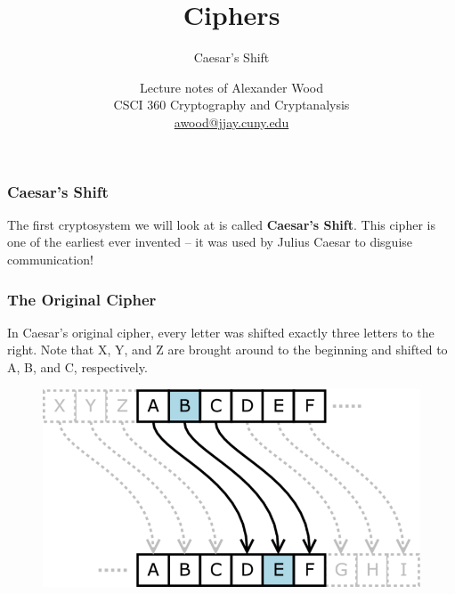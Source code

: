 \documentclass{beamer}
\title[CSCI360]{Ciphers}
\subtitle{Caesar's Shift}
\author
{Lecture notes of Alexander Wood \\ CSCI 360 Cryptography and Cryptanalysis \\ \scriptsize \href{mailto:awood@jjay.cuny.edu}{awood@jjay.cuny.edu}}
\institute[JJay]{John Jay College of Criminal Justice}
\date{}
\newcommand{\<}{\langle}
\renewcommand{\>}{\rangle}
\begin{document}

\begin{frame}
  \titlepage
\end{frame}


\begin{frame}
\frametitle{Caesar's Shift}

The first cryptosystem we will look at is called \textbf{Caesar's Shift}. This cipher is one of the earliest ever invented -- it was used by Julius Caesar to disguise communication!
\end{frame}


\begin{frame}
\frametitle{The Original Cipher}

In Caesar's original cipher, every letter was shifted exactly three letters to the right. Note that X, Y, and Z are brought around to the beginning and shifted to A, B, and C, respectively.
\begin{figure}
\includegraphics[scale=.3]{IMG/fig1.png}
\end{figure}
\end{frame}
\end{document}

